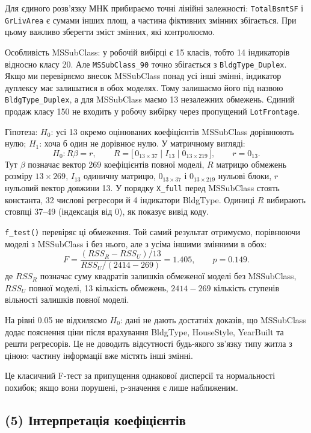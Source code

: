 Для єдиного розв'язку МНК прибираємо точні лінійні залежності:
\texttt{TotalBsmtSF} і \texttt{GrLivArea} є сумами інших площ, а частина
фіктивних змінних збігається. При цьому важливо зберегти зміст змінних,
які контролюємо.

Особливість MSSubClass: у робочій вибірці є 15 класів, тобто 14
індикаторів відносно класу 20. Але \texttt{MSSubClass\_90} точно
збігається з \texttt{BldgType\_Duplex}. Якщо ми перевіряємо внесок
MSSubClass понад усі інші змінні, індикатор дуплексу має залишатися в
обох моделях. Тому залишаємо його під назвою \texttt{BldgType\_Duplex},
а для MSSubClass маємо 13 незалежних обмежень. Єдиний продаж класу 150
не входить у робочу вибірку через пропущений \texttt{LotFrontage}.

Гіпотеза: \(H_0\): усі 13 окремо оцінюваних коефіцієнтів MSSubClass
дорівнюють нулю; \(H_1\): хоча б один не дорівнює нулю. У матричному
вигляді:
\[H_0:R\beta=r,\qquad R=\big[\,0_{13\times37}\;|\;I_{13}\;|\;0_{13\times219}\,\big],\qquad r=0_{13}.\]
Тут \(\beta\) позначає вектор 269 коефіцієнтів повної моделі, \(R\)
матрицю обмежень розміру \(13\times269\), \(I_{13}\) одиничну матрицю,
\(0_{13\times37}\) і \(0_{13\times219}\) нульові блоки, \(r\) нульовий
вектор довжини 13. У порядку \texttt{X\_full} перед MSSubClass стоять
константа, 32 числові регресори й 4 індикатори BldgType. Одиниці \(R\)
вибирають стовпці 37--49 (індексація від 0), як показує вивід коду.

\texttt{f\_test()} перевіряє ці обмеження. Той самий результат
отримуємо, порівнюючи моделі з MSSubClass і без нього, але з усіма
іншими змінними в обох:
\[F=\frac{(RSS_R-RSS_U)/13}{RSS_U/(2414-269)}=1.405,\qquad p=0.149.\] де
\(RSS_R\) позначає суму квадратів залишків обмеженої моделі без
MSSubClass, \(RSS_U\) повної моделі, 13 кількість обмежень, \(2414-269\)
кількість ступенів вільності залишків повної моделі.

На рівні 0.05 не відхиляємо \(H_0\): дані не дають достатніх доказів, що
MSSubClass додає пояснення ціни після врахування BldgType, HouseStyle,
YearBuilt та решти регресорів. Це не доводить відсутності будь-якого
зв'язку типу житла з ціною: частину інформації вже містять інші змінні.

Це класичний F-тест за припущення однакової дисперсії та нормальності
похибок; якщо вони порушені, p-значення є лише наближеним.


\Needspace{199.0pt}

\subsection{(5) Інтерпретація коефіцієнтів}

